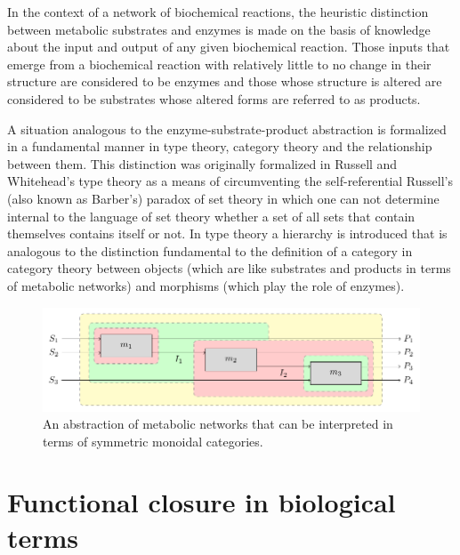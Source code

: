 \documentclass[10pt]{article}
\begin{document}
In the context of a network of biochemical reactions, the heuristic distinction between metabolic substrates and enzymes is made on the basis of knowledge about the input and output of any given biochemical reaction. Those inputs that emerge from a biochemical reaction with relatively little to no change in their structure are considered to be enzymes and those whose structure is altered are considered to be substrates whose altered forms are referred to as products. 

A situation analogous to the enzyme-substrate-product abstraction is formalized in a fundamental manner in type theory, category theory and the relationship between them. This distinction was originally formalized in Russell and Whitehead's type theory as a means of circumventing the self-referential Russell's (also known as Barber's) paradox of set theory in which one can not determine internal to the language of set theory whether a set of all sets that contain themselves contains itself or not. In type theory a hierarchy is introduced that is analogous to the distinction fundamental to the definition of a category in category theory between objects (which are like substrates and products in terms of metabolic networks) and morphisms (which play the role of enzymes).



\begin{figure}
\begin{center}
\noindent\includegraphics[width=0.9\columnwidth]{fig/blockdiagtop.pdf}
\end{center}
\caption{An abstraction of metabolic networks that can be interpreted in terms of symmetric monoidal categories.}
\label{fig:metabolicstringdiag}
\end{figure}

\section*{Functional closure in biological terms}
\end{document}
